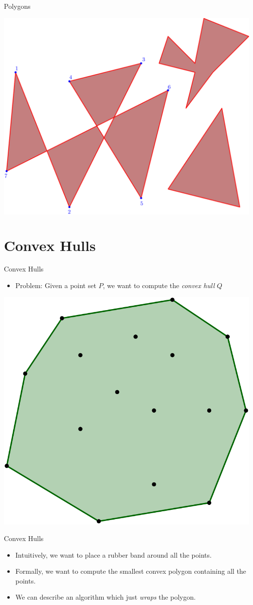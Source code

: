 \documentclass[aspectratio=169]{beamer}
\begin{document}
\begin{frame}{Polygons}
\begin{center}
        \includegraphics[width=.75\textwidth]{polys.png}
\end{center}
\end{frame}

\section{Convex Hulls}
\frame{\sectionpage}

\begin{frame}{Convex Hulls}
    \begin{itemize}
        \item Problem: Given a point set $P$, we want to compute the \textit{convex hull} $Q$ 
    \end{itemize}
    \begin{center}
    \includegraphics[width = .5\textwidth]{convexhull.png}    
    \end{center}
\end{frame}

\begin{frame}{Convex Hulls}
    \begin{itemize}
        \item Intuitively, we want to place a rubber band around all the points. \pause
        \item Formally, we want to compute the smallest convex polygon containing all the points. \pause
        \item We can describe an algorithm which just \textit{wraps} the polygon.
    \end{itemize}
\end{frame}
\end{document}
